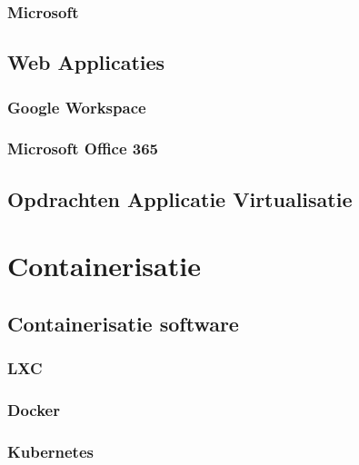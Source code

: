 \documentclass[a4paper,12pt,twoside,openright,titlepage]{book}
\begin{document}
\subsection{Microsoft}

\section{Web Applicaties}

\subsection{Google Workspace}

\subsection{Microsoft Office 365}

\section{Opdrachten Applicatie Virtualisatie}


\chapter{Containerisatie}
\section{Containerisatie software}
\subsection{LXC}
\subsection{Docker}
\subsection{Kubernetes}

\printindex
\end{document}
